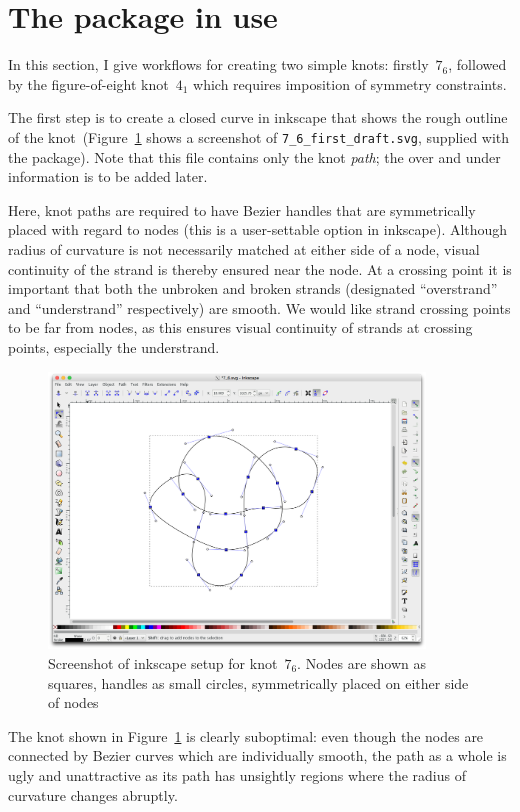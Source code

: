 \documentclass{birkjour}
\theoremstyle{definition}
\theoremstyle{remark}
\numberwithin{equation}{section}
\begin{document}
\section{The package in use}

In this section, I give workflows for creating two simple knots:
firstly~$7_6$, followed by the figure-of-eight knot~$4_1$ which
requires imposition of symmetry constraints.

The first step is to create a closed curve in inkscape that shows the
rough outline of the knot~(Figure~\ref{screenshot_inkscape_7_6} shows
a screenshot of {\tt 7\_6\_first\_draft.svg}, supplied with the
package).  Note that this file contains only the knot {\em path}; the
over and under information is to be added later.

Here, knot paths are required to have Bezier handles that are
symmetrically placed with regard to nodes (this is a user-settable
option in inkscape).  Although radius of curvature is not necessarily
matched at either side of a node, visual continuity of the strand is
thereby ensured near the node.  At a crossing point it is important
that both the unbroken and broken strands (designated ``overstrand''
and ``understrand'' respectively) are smooth.  We would like strand
crossing points to be far from nodes, as this ensures visual
continuity of strands at crossing points, especially the understrand.

\begin{figure}[h]
  \centering
    \includegraphics[width=10cm]{screenshot_inkscape_7_6.png}
\caption{Screenshot of inkscape\label{screenshot_inkscape_7_6} setup
  for knot~$7_6$.  Nodes are shown as squares, handles as small
  circles, symmetrically placed on either side of nodes}
\end{figure}

The knot shown in Figure~\ref{screenshot_inkscape_7_6} is clearly
suboptimal: even though the nodes are connected by Bezier curves which
are individually smooth, the path as a whole is ugly and unattractive
as its path has unsightly regions where the radius of curvature
changes abruptly.
\end{document}
